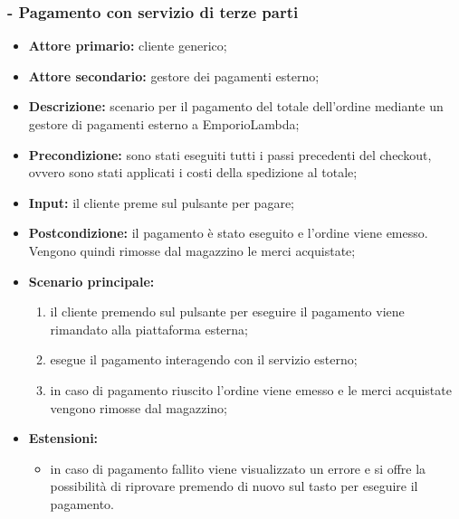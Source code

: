 \subsubsection{ - Pagamento con servizio di terze parti}
\begin{itemize}
    \item \textbf{Attore primario:} cliente generico;
    \item \textbf{Attore secondario:} gestore dei pagamenti esterno;
    \item \textbf{Descrizione:} scenario per il pagamento del totale dell'ordine mediante un gestore di pagamenti esterno a EmporioLambda;
    \item \textbf{Precondizione:} sono stati eseguiti tutti i passi precedenti del checkout, ovvero sono stati applicati i costi della spedizione al totale;
    \item \textbf{Input:} il cliente preme sul pulsante per pagare;
    \item \textbf{Postcondizione:} il pagamento è stato eseguito e l'ordine viene emesso. Vengono quindi rimosse dal magazzino le merci acquistate;
    \item \textbf{Scenario principale:}
          \begin{enumerate}
              \item il cliente premendo sul pulsante per eseguire il pagamento viene rimandato alla piattaforma esterna;
              \item esegue il pagamento interagendo con il servizio esterno;
              \item in caso di pagamento riuscito l'ordine viene emesso e le merci acquistate vengono rimosse dal magazzino;
          \end{enumerate}
    \item \textbf{Estensioni:}
          \begin{itemize}
              \item in caso di pagamento fallito viene visualizzato un errore e si offre la possibilità di riprovare premendo di nuovo sul tasto per eseguire il pagamento.
          \end{itemize}
\end{itemize}

\stepUserCase
